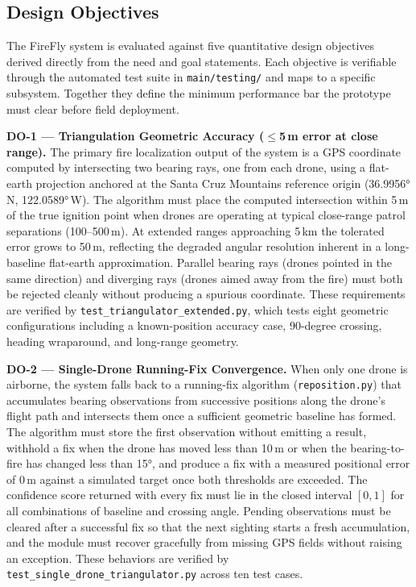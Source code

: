 \documentclass[journal, onecolumn]{IEEEtran}
\begin{document}

\subsection{Design Objectives}

The FireFly system is evaluated against five quantitative design objectives derived directly from the need and goal statements. Each objective is verifiable through the automated test suite in \texttt{main/testing/} and maps to a specific subsystem. Together they define the minimum performance bar the prototype must clear before field deployment.

\vspace{0.75em}

\textbf{DO-1 — Triangulation Geometric Accuracy ($\leq$5\,m error at close range).}
The primary fire localization output of the system is a GPS coordinate computed by intersecting two bearing rays, one from each drone, using a flat-earth projection anchored at the Santa Cruz Mountains reference origin (36.9956°\,N, 122.0589°\,W). The algorithm must place the computed intersection within 5\,m of the true ignition point when drones are operating at typical close-range patrol separations (100–500\,m). At extended ranges approaching 5\,km the tolerated error grows to 50\,m, reflecting the degraded angular resolution inherent in a long-baseline flat-earth approximation. Parallel bearing rays (drones pointed in the same direction) and diverging rays (drones aimed away from the fire) must both be rejected cleanly without producing a spurious coordinate. These requirements are verified by \texttt{test\_triangulator\_extended.py}, which tests eight geometric configurations including a known-position accuracy case, 90-degree crossing, heading wraparound, and long-range geometry.

\vspace{0.75em}

\textbf{DO-2 — Single-Drone Running-Fix Convergence.}
When only one drone is airborne, the system falls back to a running-fix algorithm (\texttt{reposition.py}) that accumulates bearing observations from successive positions along the drone's flight path and intersects them once a sufficient geometric baseline has formed. The algorithm must store the first observation without emitting a result, withhold a fix when the drone has moved less than 10\,m or when the bearing-to-fire has changed less than 15°, and produce a fix with a measured positional error of 0\,m against a simulated target once both thresholds are exceeded. The confidence score returned with every fix must lie in the closed interval $[0, 1]$ for all combinations of baseline and crossing angle. Pending observations must be cleared after a successful fix so that the next sighting starts a fresh accumulation, and the module must recover gracefully from missing GPS fields without raising an exception. These behaviors are verified by \texttt{test\_single\_drone\_triangulator.py} across ten test cases.
\end{document}
